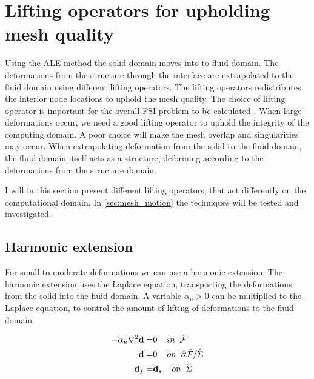 \section{Lifting operators for upholding mesh quality} \label{sec:meshmotion}
Using the ALE method the solid domain moves into to fluid domain. The deformations from the structure through the interface are extrapolated to the fluid domain using different lifting operators. The lifting operators redistributes the interior node locations to uphold the mesh quality.  
The choice of lifting operator is important for the overall FSI problem to be calculated \cite{Wick2011a}. When large deformations occur, we need a good lifting operator to uphold the integrity of the computing domain. A poor choice will make the mesh overlap and singularities may occur. 
When extrapolating deformation from the solid to the fluid domain, the fluid domain itself acts as a structure, deforming according to the deformations from the structure domain.\newline

I will in this section present different lifting operators, that act differently on the computational domain. In \ref{sec:mesh_motion} the techniques will be tested and investigated.

\subsection{Harmonic extension}
For small to moderate deformations we can use a harmonic extension. The harmonic extension uses the Laplace equation, transporting the deformations from the solid into the fluid domain. A variable $\alpha_u > 0$ can be multiplied to the Laplace equation, to control the amount of lifting of deformations to the fluid domain.

\begin{align}
 - \alpha_u \nabla^2 \bold{d} =& 0\hspace{4mm} in \hspace{2mm} \hat{\mathcal{F}}\\
  \hspace{4mm} \bold{d} =& 0 \hspace{4mm } on \hspace{2mm }  \partial \hat{\mathcal{F}} / \hat{\Sigma} \\
  \bold{d}_f =& \bold{d}_s \hspace{4mm } on \hspace{2mm } \hat{\Sigma} 
\end{align}


